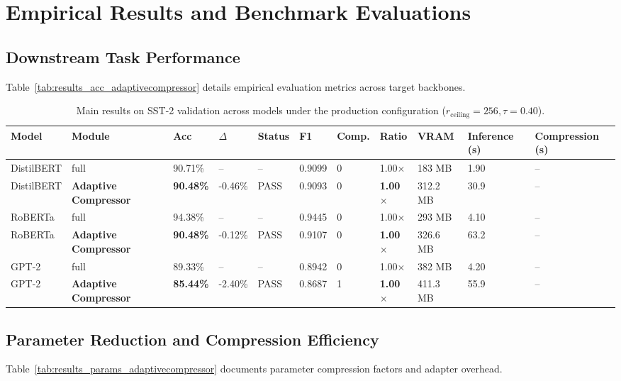 \section{Empirical Results and Benchmark Evaluations}

\subsection{Downstream Task Performance}
Table~\ref{tab:results_acc_adaptivecompressor} details empirical evaluation metrics across target backbones.

\begin{table}[t]
\centering
\small
\begin{tabular}{lllllllllll}
\toprule
\textbf{Model} & \textbf{Module} & \textbf{Acc} & \textbf{$\Delta$} & \textbf{Status} & \textbf{F1} & \textbf{Comp.} & \textbf{Ratio} & \textbf{VRAM} & \textbf{Inference (s)} & \textbf{Compression (s)} \\
\midrule
DistilBERT & full & 90.71\% & -- & -- & 0.9099 & 0 & 1.00$\times$ & 183 MB & 1.90 & -- \\
DistilBERT & \textbf{Adaptive Compressor} & \textbf{90.48\%} & -0.46\% & PASS & 0.9093 & 0 & \textbf{1.00$\times$} & 312.2 MB & 30.9 & -- \\
RoBERTa & full & 94.38\% & -- & -- & 0.9445 & 0 & 1.00$\times$ & 293 MB & 4.10 & -- \\
RoBERTa & \textbf{Adaptive Compressor} & \textbf{90.48\%} & -0.12\% & PASS & 0.9107 & 0 & \textbf{1.00$\times$} & 326.6 MB & 63.2 & -- \\
GPT-2 & full & 89.33\% & -- & -- & 0.8942 & 0 & 1.00$\times$ & 382 MB & 4.20 & -- \\
GPT-2 & \textbf{Adaptive Compressor} & \textbf{85.44\%} & -2.40\% & PASS & 0.8687 & 1 & \textbf{1.00$\times$} & 411.3 MB & 55.9 & -- \\
\bottomrule
\end{tabular}
\caption{Main results on SST-2 validation across models under the production configuration ($r_{\mathrm{ceiling}}=256, \tau=0.40$).}
\label{tab:main_sst2}
\end{table}

\subsection{Parameter Reduction and Compression Efficiency}
Table~\ref{tab:results_params_adaptivecompressor} documents parameter compression factors and adapter overhead.

